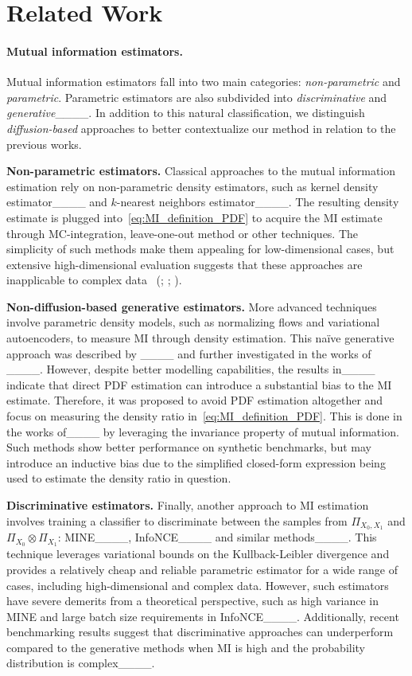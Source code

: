 \section{Related Work}
\paragraph{Mutual information estimators.}
Mutual information estimators fall into two main categories: \emph{non-parametric} and \emph{parametric}.
Parametric estimators are also subdivided into \emph{discriminative} and \emph{generative}____.
In addition to this natural classification, we distinguish \emph{diffusion-based} approaches to better contextualize our method in relation to the previous works.

\textbf{Non-parametric estimators.}
Classical approaches to the mutual information estimation rely on non-parametric density estimators, such as kernel density estimator____ and $ k $-nearest neighbors estimator____.
The resulting density estimate is plugged into~\eqref{eq:MI_definition_PDF} to acquire the MI estimate through MC-integration, leave-one-out method or other techniques.
The simplicity of such methods make them appealing for low-dimensional cases, but extensive high-dimensional evaluation suggests that these approaches are inapplicable to complex data 
~(\citealt[\wasyparagraph~5.3]{goldfeld2019estimating_information_flow}; \citealt[\wasyparagraph~6.2]{czyz2023beyond_normal}; \citealt[Table 1]{butakov2024normflows}).

\textbf{Non-diffusion-based generative estimators.}
More advanced techniques involve parametric density models, such as normalizing flows and variational autoencoders, to measure MI through density estimation.
This na\"{i}ve generative approach was described by ____ and further investigated in the works of ____.
However, despite better modelling capabilities, the results in____ indicate that direct PDF estimation can introduce a substantial bias to the MI estimate.
Therefore, it was proposed to avoid PDF estimation altogether and focus on measuring the density ratio in~\eqref{eq:MI_definition_PDF}.
This is done in the works of____
by leveraging the invariance property of mutual information.
Such methods show better performance on synthetic benchmarks, but may introduce an inductive bias due to the simplified closed-form expression being used to estimate the density ratio in question.

\textbf{Discriminative estimators.}
Finally, another approach to MI estimation involves training a classifier to discriminate between the samples from $ \Pi_{X_0,X_1} $ and $ \Pi_{X_0} \otimes \Pi_{X_1}$:  MINE____, InfoNCE____ and similar methods____.
This technique leverages variational bounds on the Kullback-Leibler divergence and provides a relatively cheap and reliable parametric estimator for a wide range of cases, including high-dimensional and complex data.
However, such estimators have severe demerits from a theoretical perspective, such as high variance in MINE and large batch size requirements in InfoNCE____.
Additionally, recent benchmarking results suggest that discriminative approaches can underperform compared to the generative methods when MI is high and the probability distribution is complex____.

